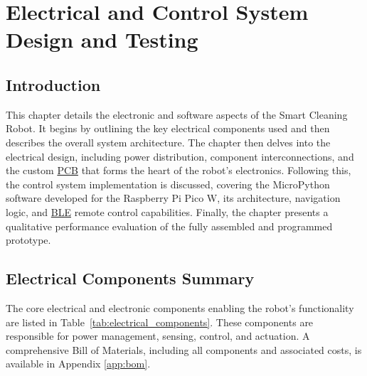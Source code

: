 \chapter{Electrical and Control System Design and Testing}
\label{chap:electrical_control_performance} %

\section{Introduction}
\label{sec:elec_control_intro}
This chapter details the electronic and software aspects of the Smart Cleaning Robot. It begins by outlining the key electrical components used and then describes the overall system architecture. The chapter then delves into the electrical design, including power distribution, component interconnections, and the custom \hyperref[term:pcb]{PCB} that forms the heart of the robot's electronics. Following this, the control system implementation is discussed, covering the MicroPython software developed for the Raspberry Pi Pico W, its architecture, navigation logic, and \hyperref[term:ble]{BLE} remote control capabilities. Finally, the chapter presents a qualitative performance evaluation of the fully assembled and programmed prototype.

\section{Electrical Components Summary}
\label{sec:electrical_components_summary}
The core electrical and electronic components enabling the robot's functionality are listed in Table~\ref{tab:electrical_components}. These components are responsible for power management, sensing, control, and actuation. A comprehensive Bill of Materials, including all components and associated costs, is available in Appendix \ref{app:bom}.

